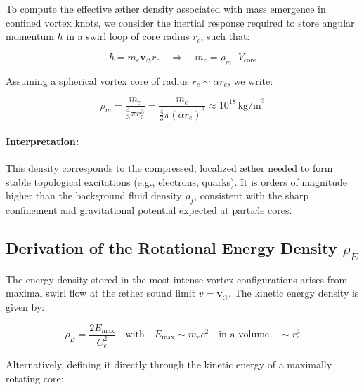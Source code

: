 \documentclass[preprint]{revtex4-2}
\begin{document}
                To compute the effective æther density associated with mass emergence in confined vortex knots, we consider the inertial response required to store angular momentum \( \hbar \) in a swirl loop of core radius \( r_c \), such that:
        
                \[
                \hbar = m_e \mathbf{v}_{\scriptscriptstyle\boldsymbol{\circlearrowleft}} r_c
                \quad \Rightarrow \quad
                m_e = \rho_{\scriptscriptstyle\boldsymbol\!m} \cdot V_{\text{core}}
                \]
        
                Assuming a spherical vortex core of radius \( r_c \sim \alpha r_e \), we write:
        
                \[
                \rho_{\scriptscriptstyle\boldsymbol\!m} = \frac{m_e}{\frac{4}{3} \pi r_c^3}
                = \frac{m_e}{\frac{4}{3} \pi (\alpha r_e)^3}
                \approx 10^{18} \, \text{kg/m}^3
                \]
        
                \paragraph{Interpretation:}
                This density corresponds to the compressed, localized æther needed to form stable topological excitations (e.g., electrons, quarks). It is orders of magnitude higher than the background fluid density \( \rho_{\scriptscriptstyle\boldsymbol\!f} \), consistent with the sharp confinement and gravitational potential expected at particle cores.
        
                \subsection{Derivation of the Rotational Energy Density \boldmath\( \rho_{\scriptscriptstyle\boldsymbol\!E} \)}
        
                The energy density stored in the most intense vortex configurations arises from maximal swirl flow at the æther sound limit \( v = \mathbf{v}_{\scriptscriptstyle\boldsymbol{\circlearrowleft}} \). The kinetic energy density is given by:
        
                \[
                    \rho_{\scriptscriptstyle\boldsymbol\!E} = \frac{2 E_{\text{max}}}{C_e^2}
                    \quad \text{with} \quad
                    E_{\text{max}} \sim m_e c^2 \quad \text{in a volume} \quad \sim r_c^3
                \]
        
                Alternatively, defining it directly through the kinetic energy of a maximally rotating core:
        
\end{document}
